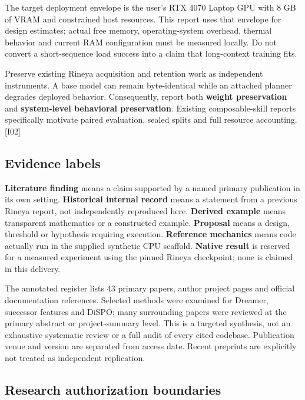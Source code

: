 \documentclass[
  11pt,
  a4paper,
]{article}
\begin{document}
The target deployment envelope is the user's RTX 4070 Laptop GPU with 8
GB of VRAM and constrained host resources. This report uses that
envelope for design estimates; actual free memory, operating-system
overhead, thermal behavior and current RAM configuration must be
measured locally. Do not convert a short-sequence load success into a
claim that long-context training fits.

Preserve existing Rineya acquisition and retention work as independent
instruments. A base model can remain byte-identical while an attached
planner degrades deployed behavior. Consequently, report both
\textbf{weight preservation} and \textbf{system-level behavioral
preservation}. Existing composable-skill reports specifically motivate
paired evaluation, sealed splits and full resource accounting. {[}I02{]}

\subsection{Evidence labels}\label{evidence-labels}

\textbf{Literature finding} means a claim supported by a named primary
publication in its own setting. \textbf{Historical internal record}
means a statement from a previous Rineya report, not independently
reproduced here. \textbf{Derived example} means transparent mathematics
or a constructed example. \textbf{Proposal} means a design, threshold or
hypothesis requiring execution. \textbf{Reference mechanics} means code
actually run in the supplied synthetic CPU scaffold. \textbf{Native
result} is reserved for a measured experiment using the pinned Rineya
checkpoint; none is claimed in this delivery.

The annotated register lists 43 primary papers, author project pages and
official documentation references. Selected methods were examined for
Dreamer, successor features and DiSPO; many surrounding papers were
reviewed at the primary abstract or project-summary level. This is a
targeted synthesis, not an exhaustive systematic review or a full audit
of every cited codebase. Publication venue and version are separated
from access date. Recent preprints are explicitly not treated as
independent replication.

\subsection{Research authorization
boundaries}\label{research-authorization-boundaries}
\end{document}
